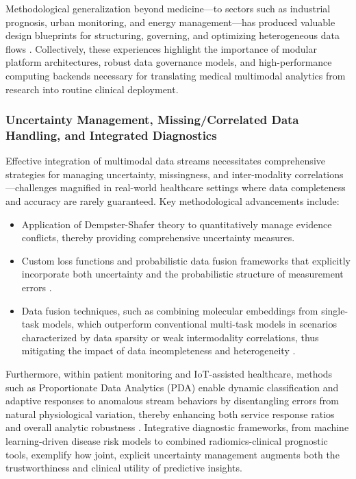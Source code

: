 Methodological generalization beyond medicine—to sectors such as industrial prognosis, urban monitoring, and energy management—has produced valuable design blueprints for structuring, governing, and optimizing heterogeneous data flows \cite{ref66,ref67,ref68,ref70,ref71,ref72,ref75,ref84}. Collectively, these experiences highlight the importance of modular platform architectures, robust data governance models, and high-performance computing backends necessary for translating medical multimodal analytics from research into routine clinical deployment.

\subsubsection{Uncertainty Management, Missing/Correlated Data Handling, and Integrated Diagnostics}

Effective integration of multimodal data streams necessitates comprehensive strategies for managing uncertainty, missingness, and inter-modality correlations—challenges magnified in real-world healthcare settings where data completeness and accuracy are rarely guaranteed. Key methodological advancements include:

\begin{itemize}
    \item Application of Dempster-Shafer theory to quantitatively manage evidence conflicts, thereby providing comprehensive uncertainty measures.
    \item Custom loss functions and probabilistic data fusion frameworks that explicitly incorporate both uncertainty and the probabilistic structure of measurement errors \cite{ref73,ref76,ref77,ref84}.
    \item Data fusion techniques, such as combining molecular embeddings from single-task models, which outperform conventional multi-task models in scenarios characterized by data sparsity or weak intermodality correlations, thus mitigating the impact of data incompleteness and heterogeneity \cite{ref89}.
\end{itemize}

Furthermore, within patient monitoring and IoT-assisted healthcare, methods such as Proportionate Data Analytics (PDA) enable dynamic classification and adaptive responses to anomalous stream behaviors by disentangling errors from natural physiological variation, thereby enhancing both service response ratios and overall analytic robustness \cite{ref90}. Integrative diagnostic frameworks, from machine learning-driven disease risk models to combined radiomics-clinical prognostic tools, exemplify how joint, explicit uncertainty management augments both the trustworthiness and clinical utility of predictive insights.

